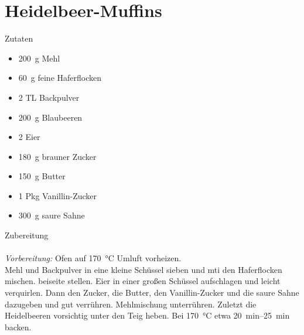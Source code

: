 \section*{Heidelbeer-Muffins}
\ihead{}\ohead{}
\cfoot{}
{\Large Zutaten}
\begin{multicols}{2}
\begin{itemize}
    \item \SI{200}{g} Mehl
    \item \SI{60}{g} feine Haferflocken
    \item \num{2} TL Backpulver
    \item \SI{200}{g} Blaubeeren
    \item \num{2} Eier
    \item \SI{180}{g} brauner Zucker
    \item \SI{150}{g} Butter
    \item \num{1} Pkg Vanillin-Zucker
    \item \SI{300}{g} saure Sahne
\end{itemize}
\end{multicols}
\noindent
{\Large Zubereitung}\\
\\
\textit{Vorbereitung:} Ofen auf \SI{170}{\celsius} Umluft vorheizen.\\
Mehl und Backpulver in eine kleine Schüssel sieben und mti den Haferflocken mischen. 
beiseite stellen.
Eier in einer großen Schüssel aufschlagen und leicht verquirlen.
Dann den Zucker, die Butter, den Vanillin-Zucker und die saure Sahne dazugeben und gut verrühren. 
Mehlmischung unterrühren.
Zuletzt die Heidelbeeren vorsichtig unter den Teig heben.
Bei \SI{170}{\celsius} etwa \SIrange{20}{25}{min} backen.
